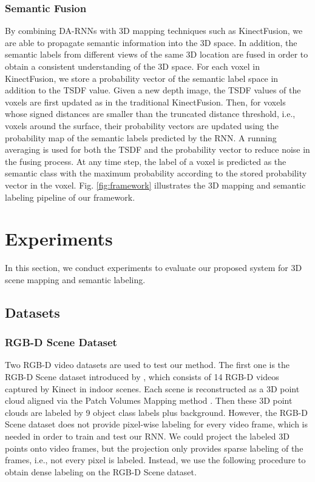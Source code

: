 \documentclass[conference]{IEEEtran}
\begin{document}
\subsubsection{Semantic Fusion}

By combining DA-RNNs with 3D mapping techniques such as KinectFusion, we are able to propagate semantic information into the 3D space. In addition, the semantic labels from different views of the same 3D location are fused in order to obtain a consistent understanding of the 3D space. For each voxel in KinectFusion, we store a probability vector of the semantic label space in addition to the TSDF value. Given a new depth image, the TSDF values of the voxels are first updated as in the traditional KinectFusion. Then, for voxels whose signed distances are smaller than the truncated distance threshold, i.e., voxels around the surface, their probability vectors are updated using the probability map of the semantic labels predicted by the RNN. A running averaging is used for both the TSDF and the probability vector to reduce noise in the fusing process. At any time step, the label of a voxel is predicted as the semantic class with the maximum probability according to the stored probability vector in the voxel. Fig. \ref{fig:framework} illustrates the 3D mapping and semantic labeling pipeline of our framework.

\section{Experiments}

In this section, we conduct experiments to evaluate our proposed system for 3D scene mapping and semantic labeling.

\subsection{Datasets}

\subsubsection{RGB-D Scene Dataset}

Two RGB-D video datasets are used to test our method. The first one is the RGB-D Scene dataset introduced by \cite{lai2014unsupervised}, which consists of 14 RGB-D videos captured by Kinect in indoor scenes. Each scene is reconstructed as a 3D point cloud aligned via the Patch Volumes Mapping method \cite{henry2013patch}. Then these 3D point clouds are labeled by 9 object class labels plus background. However, the RGB-D Scene dataset does not provide pixel-wise labeling for every video frame, which is needed in order to train and test our RNN. We could project the labeled 3D points onto video frames, but the projection only provides sparse labeling of the frames, i.e., not every pixel is labeled. Instead, we use the following procedure to obtain dense labeling on the RGB-D Scene dataset.
\end{document}
